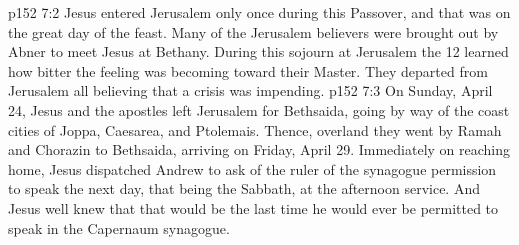 \vs p152 7:2 Jesus entered Jerusalem only once during this Passover, and that was on the great day of the feast. Many of the Jerusalem believers were brought out by Abner to meet Jesus at Bethany. During this sojourn at Jerusalem the 12 learned how bitter the feeling was becoming toward their Master. They departed from Jerusalem all believing that a crisis was impending.
\vs p152 7:3 On Sunday, April 24, Jesus and the apostles left Jerusalem for Bethsaida, going by way of the coast cities of Joppa, Caesarea, and Ptolemais. Thence, overland they went by Ramah and Chorazin to Bethsaida, arriving on Friday, April 29. Immediately on reaching home, Jesus dispatched Andrew to ask of the ruler of the synagogue permission to speak the next day, that being the Sabbath, at the afternoon service. And Jesus well knew that that would be the last time he would ever be permitted to speak in the Capernaum synagogue.
